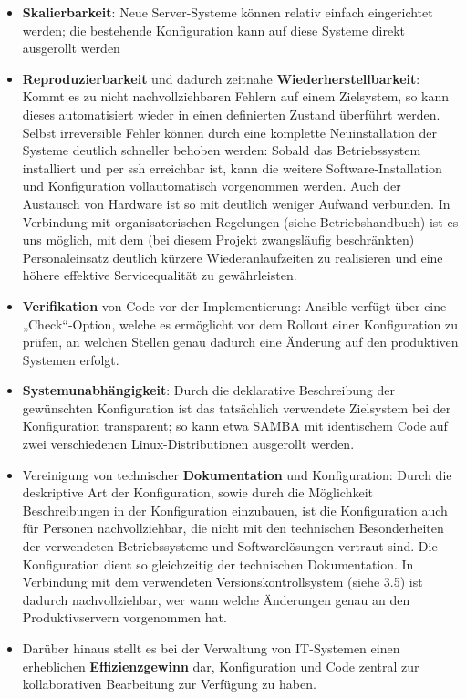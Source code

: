 \begin{itemize}
\item \textbf{Skalierbarkeit}: Neue Server-Systeme können relativ einfach eingerichtet werden; die bestehende Konfiguration kann auf diese Systeme direkt ausgerollt werden
\item \textbf{Reproduzierbarkeit} und dadurch zeitnahe \textbf{Wiederherstellbarkeit}: Kommt es zu nicht nachvollziehbaren Fehlern auf einem Zielsystem, so kann dieses automatisiert wieder in einen definierten Zustand überführt werden. Selbst irreversible Fehler können durch eine komplette Neuinstallation der Systeme deutlich schneller behoben werden: Sobald das Betriebssystem installiert und per ssh erreichbar ist, kann die weitere Software-Installation und Konfiguration vollautomatisch vorgenommen werden. Auch der Austausch von Hardware ist so mit deutlich weniger Aufwand verbunden. In Verbindung mit organisatorischen Regelungen (siehe Betriebshandbuch) ist es uns möglich, mit dem (bei diesem Projekt zwangsläufig beschränkten) Personaleinsatz deutlich kürzere Wiederanlaufzeiten zu realisieren und eine höhere effektive Servicequalität zu gewährleisten.
\item \textbf{Verifikation} von Code vor der Implementierung: Ansible verfügt über eine „Check“-Option, welche es ermöglicht vor dem Rollout einer Konfiguration zu prüfen, an welchen Stellen genau dadurch eine Änderung auf den produktiven Systemen erfolgt.
\item \textbf{Systemunabhängigkeit}: Durch die deklarative Beschreibung der gewünschten Konfiguration ist das tatsächlich verwendete Zielsystem bei der Konfiguration transparent; so kann etwa SAMBA mit identischem Code auf zwei verschiedenen Linux-Distributionen ausgerollt werden.
\item Vereinigung von technischer \textbf{Dokumentation} und Konfiguration: Durch die deskriptive Art der Konfiguration, sowie durch die Möglichkeit Beschreibungen in der Konfiguration einzubauen, ist die Konfiguration auch für Personen nachvollziehbar, die nicht mit den technischen Besonderheiten der verwendeten Betriebssysteme und Softwarelösungen vertraut sind. Die Konfiguration dient so gleichzeitig der technischen Dokumentation. In Verbindung mit dem verwendeten Versionskontrollsystem (siehe 3.5) ist dadurch nachvollziehbar, wer wann welche Änderungen genau an den Produktivservern vorgenommen hat.
\item Darüber hinaus stellt es bei der Verwaltung von IT-Systemen einen erheblichen \textbf{Effizienzgewinn} dar, Konfiguration und Code zentral zur kollaborativen Bearbeitung zur Verfügung zu haben.
\end{itemize}

